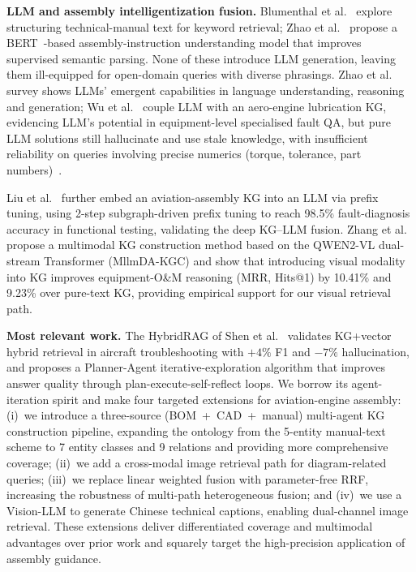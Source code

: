 \documentclass[applsci,article,submit,pdftex,moreauthors]{Definitions/mdpi}
\begin{document}
\textbf{LLM and assembly intelligentization fusion.} Blumenthal et al.~\citep{blumenthal2020nlp} explore structuring technical-manual text for keyword retrieval; Zhao et al.~\citep{zhao2022assembly} propose a BERT~\citep{devlin2019bert}-based assembly-instruction understanding model that improves supervised semantic parsing. None of these introduce LLM generation, leaving them ill-equipped for open-domain queries with diverse phrasings. Zhao et al.~\citep{zhao2023llmsurvey} survey shows LLMs' emergent capabilities in language understanding, reasoning and generation; Wu et al.~\citep{wu2024engine} couple LLM with an aero-engine lubrication KG, evidencing LLM's potential in equipment-level specialised fault QA, but pure LLM solutions still hallucinate and use stale knowledge, with insufficient reliability on queries involving precise numerics (torque, tolerance, part numbers)~\citep{fan2024ragsurvey}.

Liu et al.~\citep{liu2024jointkg} further embed an aviation-assembly KG into an LLM via prefix tuning, using 2-step subgraph-driven prefix tuning to reach 98.5\% fault-diagnosis accuracy in functional testing, validating the deep KG--LLM fusion. Zhang et al.~\citep{zhang2025mllmkgc} propose a multimodal KG construction method based on the QWEN2-VL dual-stream Transformer (MllmDA-KGC) and show that introducing visual modality into KG improves equipment-O\&M reasoning (MRR, Hits@1) by 10.41\% and 9.23\% over pure-text KG, providing empirical support for our visual retrieval path.

\textbf{Most relevant work.} The HybridRAG of Shen et al.~\citep{shen2025hybridrag} validates KG+vector hybrid retrieval in aircraft troubleshooting with $+4\%$ F1 and $-7\%$ hallucination, and proposes a Planner-Agent iterative-exploration algorithm that improves answer quality through plan-execute-self-reflect loops. We borrow its agent-iteration spirit and make four targeted extensions for aviation-engine assembly: (i)~we introduce a three-source (BOM~+~CAD~+~manual) multi-agent KG construction pipeline, expanding the ontology from the 5-entity manual-text scheme to 7 entity classes and 9 relations and providing more comprehensive coverage; (ii)~we add a cross-modal image retrieval path for diagram-related queries; (iii)~we replace linear weighted fusion with parameter-free RRF, increasing the robustness of multi-path heterogeneous fusion; and (iv)~we use a Vision-LLM to generate Chinese technical captions, enabling dual-channel image retrieval. These extensions deliver differentiated coverage and multimodal advantages over prior work and squarely target the high-precision application of assembly guidance.
\end{document}
